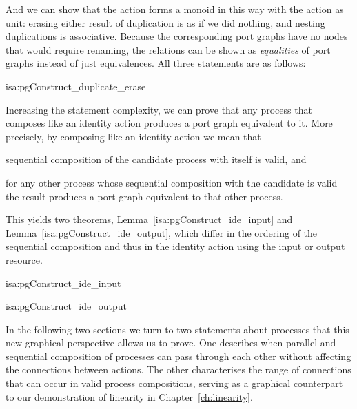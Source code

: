 \documentclass[class=smolathesis,crop=false]{standalone}
\begin{document}
And we can show that the  action forms a monoid in this way with the  action as unit: erasing either result of duplication is as if we did nothing, and nesting duplications is associative.
Because the corresponding port graphs have no nodes that would require renaming, the relations can be shown as \emph{equalities} of port graphs instead of just equivalences.
All three statements are as follows:
\begin{isalemma}{isa:pgConstruct_duplicate_erase}
  
\end{isalemma}

Increasing the statement complexity, we can prove {\cbstart}that any process that composes like an identity action produces a port graph equivalent to it.
More precisely, by composing like an identity action we mean that
\begin{enumerate*}[label=(\roman*)]
  \item sequential composition of the candidate process with itself is valid, and
  \item for any other process whose sequential composition with the candidate is valid the result produces a port graph equivalent to that other process.
\end{enumerate*}
This yields two theorems, Lemma~\ref{isa:pgConstruct_ide_input} and Lemma~\ref{isa:pgConstruct_ide_output}, which differ in the ordering of the sequential composition and thus in the identity action using the input or output resource.
\cbend

\begin{isalemma}{isa:pgConstruct_ide_input}
  
\end{isalemma}
\begin{isalemma}{isa:pgConstruct_ide_output}
  
\end{isalemma}

In the following two sections we turn to two statements about processes that this new graphical perspective allows us to prove.
One describes when parallel and sequential composition of processes can pass through each other without affecting the connections between actions.
The other characterises the range of connections that can occur in valid process compositions, serving as a graphical counterpart to our demonstration of linearity in Chapter~\ref{ch:linearity}.
\end{document}
